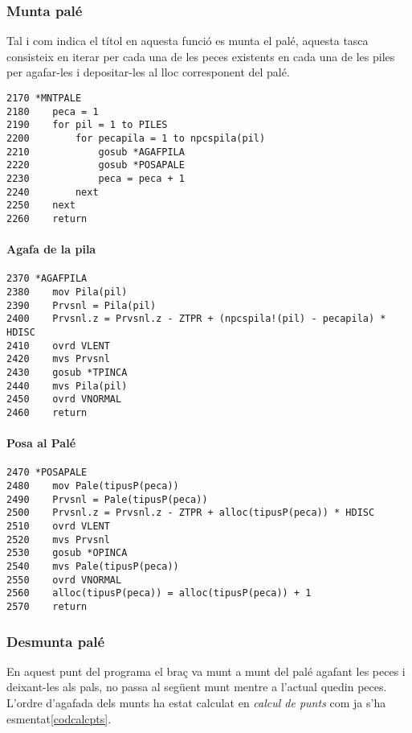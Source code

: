 \subsubsection{Munta palé}
Tal i com indica el títol en aquesta funció es munta el palé, aquesta tasca
consisteix en iterar per cada una de les peces existents en cada una de les
piles per agafar-les i depositar-les al lloc corresponent del palé.

\begin{verbatim}
2170 *MNTPALE
2180    peca = 1
2190    for pil = 1 to PILES 
2200        for pecapila = 1 to npcspila(pil)
2210            gosub *AGAFPILA
2220            gosub *POSAPALE
2230            peca = peca + 1
2240        next
2250    next
2260    return
\end{verbatim}

\paragraph{Agafa de la pila}
\begin{verbatim}
2370 *AGAFPILA
2380    mov Pila(pil)
2390    Prvsnl = Pila(pil)
2400    Prvsnl.z = Prvsnl.z - ZTPR + (npcspila!(pil) - pecapila) * HDISC
2410    ovrd VLENT
2420    mvs Prvsnl
2430    gosub *TPINCA
2440    mvs Pila(pil)
2450    ovrd VNORMAL
2460    return
\end{verbatim}

\paragraph{Posa al Palé}
\begin{verbatim}
2470 *POSAPALE
2480    mov Pale(tipusP(peca))
2490    Prvsnl = Pale(tipusP(peca))
2500    Prvsnl.z = Prvsnl.z - ZTPR + alloc(tipusP(peca)) * HDISC
2510    ovrd VLENT
2520    mvs Prvsnl
2530    gosub *OPINCA
2540    mvs Pale(tipusP(peca))
2550    ovrd VNORMAL
2560    alloc(tipusP(peca)) = alloc(tipusP(peca)) + 1
2570    return
\end{verbatim}

\subsubsection{Desmunta palé}
En aquest punt del programa el braç va munt a munt del palé agafant les peces
i deixant-les als pals, no passa al següent munt mentre a l'actual quedin peces.
L'ordre d'agafada dels munts ha estat calculat en \emph{calcul de punts} com ja s'ha
esmentat\ref{codcalcpts}.

